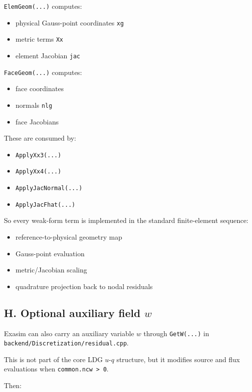 \documentclass[11pt]{article}
\begin{document}
\texttt{ElemGeom(...)} computes:

\begin{itemize}[leftmargin=*]
\item physical Gauss-point coordinates \texttt{xg}
\item metric terms \texttt{Xx}
\item element Jacobian \texttt{jac}
\end{itemize}

\texttt{FaceGeom(...)} computes:

\begin{itemize}[leftmargin=*]
\item face coordinates
\item normals \texttt{nlg}
\item face Jacobians
\end{itemize}

These are consumed by:

\begin{itemize}[leftmargin=*]
\item \texttt{ApplyXx3(...)}
\item \texttt{ApplyXx4(...)}
\item \texttt{ApplyJacNormal(...)}
\item \texttt{ApplyJacFhat(...)}
\end{itemize}

So every weak-form term is implemented in the standard finite-element
sequence:

\begin{itemize}[leftmargin=*]
\item reference-to-physical geometry map
\item Gauss-point evaluation
\item metric/Jacobian scaling
\item quadrature projection back to nodal residuals
\end{itemize}

\subsection*{H. Optional auxiliary field $w$}

Exasim can also carry an auxiliary variable $w$ through \texttt{GetW(...)} in
\texttt{backend/Discretization/residual.cpp}.

This is not part of the core LDG $u$-$q$ structure, but it modifies source and
flux evaluations when \texttt{common.ncw > 0}.

Then:
\end{document}

